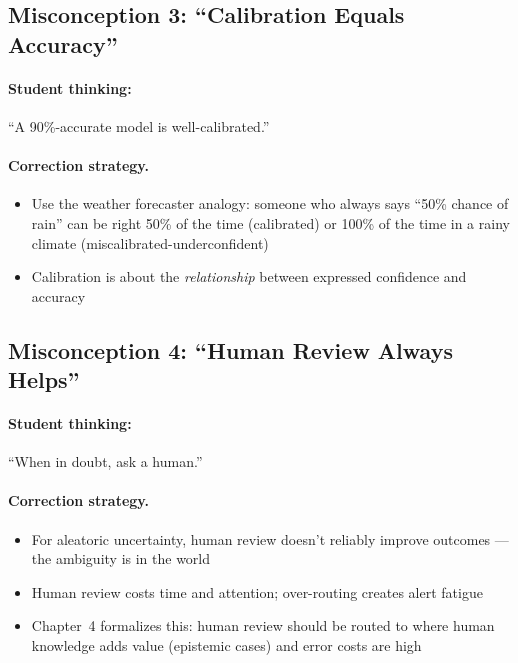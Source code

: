 \subsection{Misconception 3: ``Calibration Equals Accuracy''}

\paragraph{Student thinking:} ``A 90\%-accurate model is well-calibrated.''

\paragraph{Correction strategy.}
\begin{itemize}
    \item Use the weather forecaster analogy: someone who always says ``50\% chance of rain'' can be right 50\% of the time (calibrated) or 100\% of the time in a rainy climate (miscalibrated-underconfident)
    \item Calibration is about the \emph{relationship} between expressed confidence and accuracy
\end{itemize}

\subsection{Misconception 4: ``Human Review Always Helps''}

\paragraph{Student thinking:} ``When in doubt, ask a human.''

\paragraph{Correction strategy.}
\begin{itemize}
    \item For aleatoric uncertainty, human review doesn't reliably improve outcomes --- the ambiguity is in the world
    \item Human review costs time and attention; over-routing creates alert fatigue
    \item Chapter~4 formalizes this: human review should be routed to where human knowledge adds value (epistemic cases) and error costs are high
\end{itemize}

